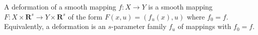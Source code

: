 A deformation of a smooth mapping $f: X \to Y$ is a smooth mapping $F: X \times \mathbf{R}^s \to Y \times \mathbf{R}^s$ of the form $F(x, u) = (f_u(x), u)$ where $f_0 = f$. Equivalently, a deformation is an $s$-parameter family $f_u$ of mappings with $f_0 = f$.
